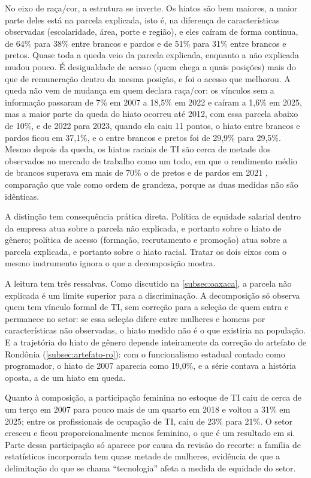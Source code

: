 No eixo de raça/cor, a estrutura se inverte. Os hiatos são bem maiores, a maior parte deles está na parcela explicada, isto é, na diferença de características observadas (escolaridade, área, porte e região), e eles caíram de forma contínua, de 64\% para 38\% entre brancos e pardos e de 51\% para 31\% entre brancos e pretos. Quase toda a queda veio da parcela explicada, enquanto a não explicada mudou pouco. É desigualdade de acesso (quem chega a quais posições) mais do que de remuneração dentro da mesma posição, e foi o acesso que melhorou. A queda não vem de mudança em quem declara raça/cor: os vínculos sem a informação passaram de 7\% em 2007 a 18,5\% em 2022 e caíram a 1,6\% em 2025, mas a maior parte da queda do hiato ocorreu até 2012, com essa parcela abaixo de 10\%, e de 2022 para 2023, quando ela caiu 11 pontos, o hiato entre brancos e pardos ficou em 37,1\%, e o entre brancos e pretos foi de 29,9\% para 29,5\%. Mesmo depois da queda, os hiatos raciais de TI são cerca de metade dos observados no mercado de trabalho como um todo, em que o rendimento médio de brancos superava em mais de 70\% o de pretos e de pardos em 2021 \cite{IBGE2022Desigualdades}, comparação que vale como ordem de grandeza, porque as duas medidas não são idênticas.

A distinção tem consequência prática direta. Política de equidade salarial dentro da empresa atua sobre a parcela não explicada, e portanto sobre o hiato de gênero; política de acesso (formação, recrutamento e promoção) atua sobre a parcela explicada, e portanto sobre o hiato racial. Tratar os dois eixos com o mesmo instrumento ignora o que a decomposição mostra.

A leitura tem três ressalvas. Como discutido na \autoref{subsec:oaxaca}, a parcela não explicada é um limite superior para a discriminação. A decomposição só observa quem tem vínculo formal de TI, sem correção para a seleção de quem entra e permanece no setor: se essa seleção difere entre mulheres e homens por características não observadas, o hiato medido não é o que existiria na população. E a trajetória do hiato de gênero depende inteiramente da correção do artefato de Rondônia (\autoref{subsec:artefato-ro}): com o funcionalismo estadual contado como programador, o hiato de 2007 aparecia como 19,0\%, e a série contava a história oposta, a de um hiato em queda.

Quanto à composição, a participação feminina no estoque de TI caiu de cerca de um terço em 2007 para pouco mais de um quarto em 2018 e voltou a 31\% em 2025; entre os profissionais de ocupação de TI, caiu de 23\% para 21\%. O setor cresceu e ficou proporcionalmente menos feminino, o que é um resultado em si. Parte dessa participação só aparece por causa da revisão do recorte: a família de estatísticos incorporada tem quase metade de mulheres, evidência de que a delimitação do que se chama ``tecnologia'' afeta a medida de equidade do setor.


